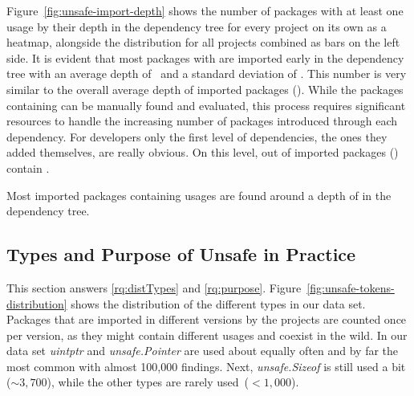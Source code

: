 Figure~\ref{fig:unsafe-import-depth} shows the number of packages with at least one \unsafe{} usage by their depth in the dependency tree for every project on its own as a heatmap, alongside the distribution for all projects combined as bars on the left side.
It is evident that most packages with \unsafe{} are imported early in the dependency tree with an average depth of \averageUnsafeImportDepth{}~and a standard deviation of \stdUnsafeImportDepth{}.
This number is very similar to the overall average depth of imported packages (\averageGeneralImportDepth{}). %
While the packages containing \unsafe{} can be manually found and evaluated, this process requires significant resources to handle the increasing number of packages introduced through each dependency. 
For developers only the first level of dependencies, the ones they added themselves, are really obvious.
On this level, \levelOneImportedUnsafePackagesCount{} out of \ImportedUnsafePackagesCount{} imported packages (\levelOneImportedUnsafePackagesShare{}) contain \unsafe{}.

\begin{tcolorbox}[boxsep=1pt, enlarge top by=5pt, title=Answer to \ref{rq:depsDepth}]
Most imported packages containing \unsafe{} usages are found around a depth of  in the dependency tree.
\end{tcolorbox}




\subsection{Types and Purpose of Unsafe in Practice}
\label{sec:eval:labeledData}

This section answers \ref{rq:distTypes} and \ref{rq:purpose}.
%
Figure~\ref{fig:unsafe-tokens-distribution} shows the distribution of the different \unsafe{} types in our data set.
Packages that are imported in different versions by the projects are counted once per version, as they might contain different \unsafe{} usages and coexist in the wild.
In our data set \textit{uintptr} and \textit{unsafe.Pointer} are used about equally often and by far the most common with almost 100,000 findings. 
Next, \textit{unsafe.Sizeof} is still used a bit ($\sim 3,700$), while the other \unsafe{} types are rarely used~($< 1,000$).

